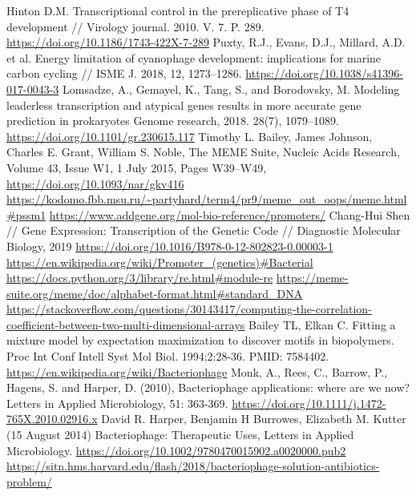 \documentclass[14pt]{extarticle}
\begin{document}
\newpage
\begin{thebibliography}{9}
     Hinton D.M. Transcriptional control in the prereplicative phase of T4 development // Virology
    journal. 2010. V. 7. P. 289. \url{https://doi.org/10.1186/1743-422X-7-289}
     Puxty, R.J., Evans, D.J., Millard, A.D. et al. Energy limitation of cyanophage development:
    implications for marine carbon cycling // ISME J. 2018, 12, 1273–1286. \url{https://doi.org/10.1038/s41396-017-0043-3}
     Lomsadze, A., Gemayel, K., Tang, S., and Borodovsky, M. Modeling leaderless transcription and
    atypical genes results in more accurate gene prediction in prokaryotes Genome research,  2018. 28(7), 1079–1089.
    \url{https://doi.org/10.1101/gr.230615.117}
     Timothy L. Bailey, James Johnson, Charles E. Grant, William S. Noble, The MEME Suite, Nucleic Acids Research, Volume 43, Issue W1, 1 July 2015, Pages W39–W49,  \url{https://doi.org/10.1093/nar/gkv416}
     \url{https://kodomo.fbb.msu.ru/~partyhard/term4/pr9/meme_out_oops/meme.html#pssm1}
     \url{https://www.addgene.org/mol-bio-reference/promoters/}
     Chang-Hui Shen // Gene Expression: Transcription of the Genetic Code // Diagnostic Molecular 
    Biology, 2019 \url{https://doi.org/10.1016/B978-0-12-802823-0.00003-1}
     \url{https://en.wikipedia.org/wiki/Promoter_(genetics)#Bacterial}
     \url{https://docs.python.org/3/library/re.html#module-re}
     \url{https://meme-suite.org/meme/doc/alphabet-format.html#standard_DNA}
     \url{https://stackoverflow.com/questions/30143417/computing-the-correlation-coefficient-between-two-multi-dimensional-arrays}
     Bailey TL, Elkan C. Fitting a mixture model by expectation maximization to discover motifs in biopolymers. Proc Int Conf Intell Syst Mol Biol. 1994;2:28-36. PMID: 7584402.
     \url{https://en.wikipedia.org/wiki/Bacteriophage}
     Monk, A., Rees, C., Barrow, P., Hagens, S. and Harper, D. (2010), Bacteriophage applications: 
    where are we now? Letters in Applied Microbiology, 51: 363-369. \url{https://doi.org/10.1111/j.1472-765X.2010.02916.x}
     David R. Harper, Benjamin H Burrowes, Elizabeth M. Kutter (15 August 2014) Bacteriophage: 
    Therapeutic Uses, Letters in Applied Microbiology.  \url{https://doi.org/10.1002/9780470015902.a0020000.pub2}
     \url{https://sitn.hms.harvard.edu/flash/2018/bacteriophage-solution-antibiotics-problem/}

\end{thebibliography}
\end{document}
